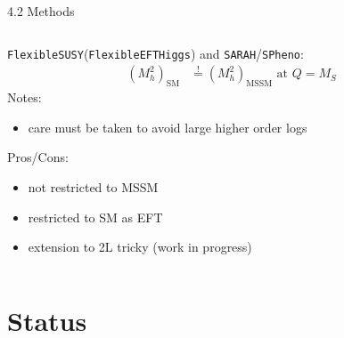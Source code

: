 \documentclass[hyperref={pdfpagelabels=false},ngerman]{beamer}
\newcommand{\cmark}{\ding{51}}%
\newcommand{\xmark}{\ding{55}}%
\newcommand{\ok}{\textcolor{darkgreen}{\cmark}}
\newcommand{\notok}{\textcolor{red}{\xmark}}
\newcommand{\MS}{\ensuremath{M_S}}
\newcommand{\SM}{\ensuremath{\text{SM}}}
\newcommand{\MSSM}{\ensuremath{\text{MSSM}}}
\newcommand{\fs}{\texttt{FlexibleSUSY}\xspace}
\newcommand{\feft}{\texttt{FlexibleEFTHiggs}\xspace}
\newcommand{\SPheno}{\texttt{SPheno}\xspace}
\newcommand{\SARAH}{\texttt{SARAH}\xspace}
\begin{document}
\begin{frame}{4.2 Methods}
    \begin{columns}
    \begin{column}{0.5\textwidth}
      \centering
      \texttt{[image: \{\{plots/kuts-9/4.2.2]}}}
    \end{column}
    \begin{column}{0.5\textwidth}
      \fs (\feft) and \SARAH/\SPheno:
      \begin{align*}
        (M_h^2)_{\SM} &\overset{!}{=} (M_h^2)_{\MSSM} \text{ at } Q = \MS
      \end{align*}
      Notes:
      \begin{itemize}
      \item care must be taken to avoid large higher order logs
      \end{itemize}
      Pros/Cons:
      \begin{itemize}
      \item[\ok] not restricted to MSSM
      \item[\notok] restricted to SM as EFT
      \item[\notok] extension to 2L tricky (work in progress)
      \end{itemize}
    \end{column}
  \end{columns}
\end{frame}

\section{Status}
\end{document}
